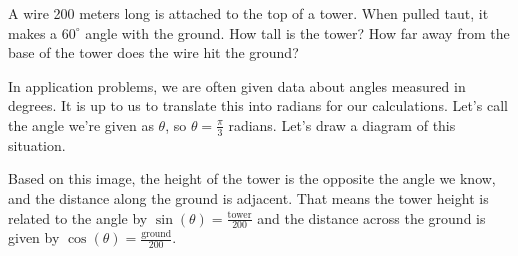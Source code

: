 \documentclass[nooutcomes]{ximera}
\begin{document}
\begin{example}

	A wire 200 meters long is attached to the top of a tower. When pulled taut, it makes a $60^\circ$ angle with the ground. How tall is the tower?
	How far away from the base of the tower does the wire hit the ground?
	
	\begin{explanation}
	
		In application problems, we are often given data about angles measured in degrees. It is up to us to translate this into radians for our 
		calculations. Let's call the angle we're given as $\theta$, so $\theta = \frac{\pi}{3}$ radians. Let's draw a diagram of this situation.

		\begin{image}[2in]
		\end{image}
		
		Based on this image, the height of the tower is the opposite the angle we know, and the distance along the ground is adjacent. That means
		the tower height is related to the angle by $\sin\left(\theta\right) = \frac{\text{tower}}{200}$ and the distance across the ground is given by
		$\cos\left(\theta\right) = \frac{\text{ground}}{200}$.
		

\end{explanation}
\end{example}
\end{document}
